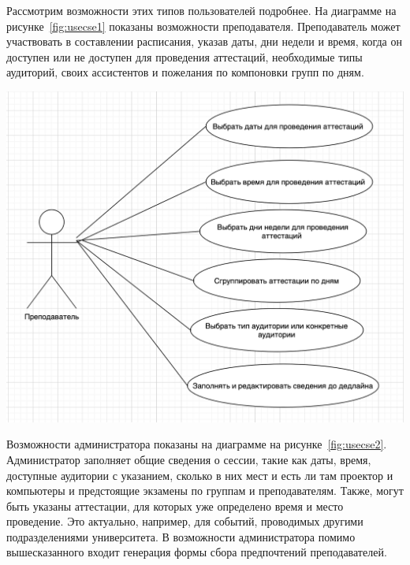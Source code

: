 Рассмотрим возможности этих типов пользователей подробнее. На диаграмме на рисунке~\ref{fig:usecse1} показаны возможности преподавателя.
Преподаватель может участвовать в составлении расписания, указав даты, дни недели и время, когда он доступен или не доступен для проведения аттестаций, необходимые типы аудиторий, своих ассистентов и пожелания по компоновки групп по дням.

\begin{minipage}{\textwidth}
	\centering
	\vspace{\mfloatsep} %
	\includegraphics[scale=0.6, keepaspectratio=true] {my_folder/images/usecase1}
	\label{fig:usecse1}  
	\vspace{\mfloatsep} %
\end{minipage}

Возможности администратора показаны на диаграмме на рисунке~\ref{fig:usecse2}.
Администратор заполняет общие сведения о сессии, такие как даты, время, доступные аудитории с указанием, сколько в них мест и есть ли там проектор и компьютеры и предстоящие экзамены по группам и преподавателям. Также, могут быть указаны аттестации, для которых уже определено время и место проведение. Это актуально, например, для событий, проводимых другими подразделениями университета. В возможности администратора помимо вышесказанного входит генерация формы сбора предпочтений преподавателей. 

